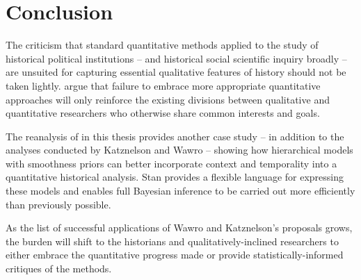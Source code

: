 \chapter{Conclusion}
\label{discussion}

The criticism that standard quantitative methods applied to the study of historical political institutions -- and historical social scientific inquiry broadly -- are unsuited for capturing essential qualitative features of history should not be taken lightly.  argue that failure to embrace more appropriate quantitative approaches will only reinforce the existing divisions between qualitative and quantitative researchers who otherwise share common interests and goals. 

The reanalysis of  in this thesis provides another case study -- in addition to the analyses conducted by Katznelson and Wawro -- showing how hierarchical models with smoothness priors can better incorporate context and temporality into a quantitative historical analysis. Stan provides a flexible language for expressing these models and enables full Bayesian inference to be carried out more efficiently than previously possible.  

As the list of successful applications of Wawro and Katznelson's proposals grows, the burden will shift to the historians and qualitatively-inclined researchers to either embrace the quantitative progress made or provide statistically-informed critiques of the methods. 

  
